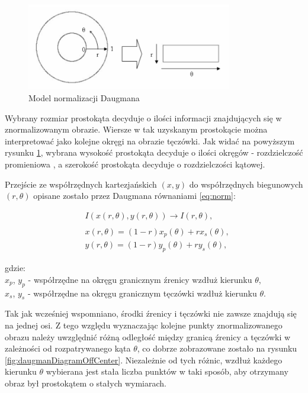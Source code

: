 \documentclass[10pt,polish,a4paper,oneside]{ppfcmthesis}
\begin{document}
\begin{figure}[ht]
  \includegraphics[width=0.8\textwidth]{images/normalization/schemaCenter.png}
  \centering
  \caption{Model normalizacji Daugmana \cite{masek}}
  \label{fig:daugmanDiagram}
\end{figure}

Wybrany rozmiar prostokąta decyduje o ilości informacji znajdujących się w znormalizowanym obrazie.
Wiersze w tak uzyskanym prostokącie można interpretowa\'c jako kolejne okręgi na obrazie tęczówki.
Jak wida\'c na powyższym rysunku \ref{fig:daugmanDiagram}, wybrana wysokoś\'c prostokąta decyduje
o ilości okręgów - rozdzielczoś\'c promieniowa , a szerokoś\'c prostokąta decyduje o rozdzielczości kątowej.\newline

Przejście ze współrzędnych kartezjańskich $(x,y)$ do współrzędnych biegunowych $(r,\theta)$ opisane zostało
przez Daugmana \cite{DaugmanHowIrisRecognitionWorks} równaniami \ref{eq:norm}:

\begin{equation}
  \begin{aligned}
    &I(x(r,\theta), y(r,\theta)) \rightarrow I(r,\theta),
    \\
    \\
    &x(r,\theta) = (1-r)x_{p}(\theta) + rx_{s}(\theta),
    \\
    &y(r,\theta) = (1-r)y_{p}(\theta) + ry_{s}(\theta),
  \end{aligned}
  \label{eq:norm}
\end{equation}

\noindent
gdzie:\\
\indent $x_{p}$, $y_{p}$ - współrzędne na okręgu granicznym \'zrenicy wzdłuż kierunku $\theta$,\\
\indent $x_{s}$, $y_{s}$ - współrzędne na okręgu granicznym tęczówki wzdłuż kierunku $\theta$.\newline

Tak jak wcześniej wspomniano, środki \'zrenicy i tęczówki nie zawsze znajdują się na jednej osi.
Z tego względu wyznaczając kolejne punkty znormalizowanego obrazu należy uwzględni\'c różną odległoś\'c
między granicą \'zrenicy a tęczówki w zależności od rozpatrywanego kąta $\theta$, co dobrze zobrazowane
zostało na rysunku \ref{fig:daugmanDiagramOffCenter}. Niezależnie od tych różnic, wzdłuż każdego kierunku
$\theta$ wybierana jest stała liczba punktów w taki sposób, aby otrzymany obraz był prostokątem
o stałych wymiarach.
\end{document}
